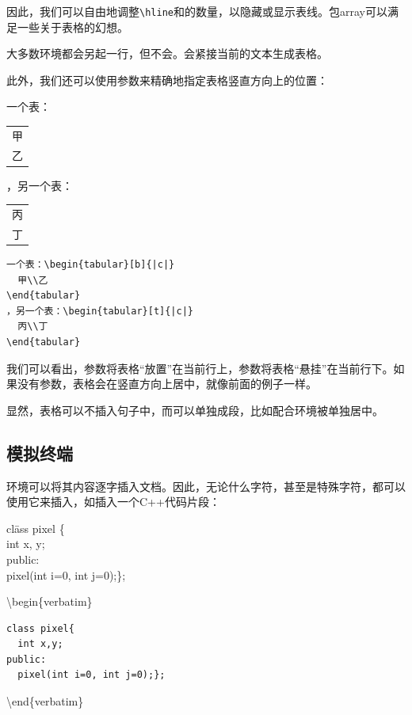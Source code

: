 因此，我们可以自由地调整\verb|\hline|和\dm{|}的数量，以隐藏或显示表线。包\textsf{array}可以满足一些关于表格的幻想。

\begin{exclamation}
大多数环境都会另起一行，但不会。会紧接当前的文本生成\linebreak 表格。
\end{exclamation}

此外，我们还可以使用参数来精确地指定表格竖直方向上的位置：

\begin{codelist}[2.12]{
一个表：\begin{tabular}[b]{|c|} 
甲\\乙
\end{tabular}
，另一个表：\begin{tabular}[t]{|c|} 
丙\\丁\end{tabular}
}
\begin{verbatim}
一个表：\begin{tabular}[b]{|c|} 
  甲\\乙
\end{tabular}
，另一个表：\begin{tabular}[t]{|c|} 
  丙\\丁
\end{tabular}\end{verbatim}
\end{codelist}

我们可以看出，参数将表格“放置”在当前行上，参数将表格“悬挂”在当前行下。如果没有参数，表格会在竖直方向上居中，就像前面的例子一样。

显然，表格可以不插入句子中，而可以单独成段，比如配合环境被单独居中。

\subsection{模拟终端}

环境可以将其内容逐字插入文档。因此，无论什么字符，甚至是特殊字符，都可以使用它来插入，如插入一个\textsf{C++}代码片段：

\begin{codelist}[2.13]{\ttfamily
  \begin{tabbing}
    cl\=ass pixel \{\\
      \>int x, y;\\
    public:\\
      \>pixel(int i=0, int j=0);\};
  \end{tabbing}
}
\ttfamily
\backslash begin\{verbatim\}
\begin{verbatim}
class pixel{
  int x,y;
public:
  pixel(int i=0, int j=0);};\end{verbatim}
\backslash end\{verbatim\}
\end{codelist}

